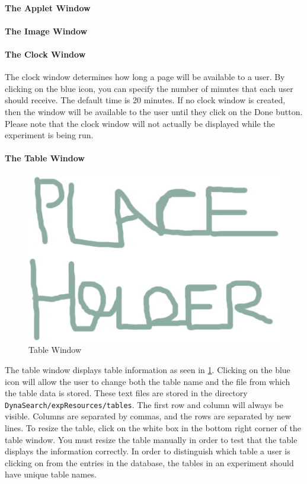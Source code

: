 \documentclass[article]{ij4uq}              %
\begin{document}
\paragraph{The Applet Window}

\paragraph{The Image Window}

\paragraph{The Clock Window}
The clock window determines how long a page will be available to a user. By clicking on the blue icon, you can specify the number of minutes that each user should receive. The default time is 20 minutes. If no clock window is created, then the window will be available to the user until they click on the Done button. Please note that the clock window will not actually be displayed while the experiment is being run. 

\paragraph{The Table Window}

\begin{figure}[h!]
 \centering
 \includegraphics[width=5.0in]{figures/place.eps}
 \caption{Table Window}
 \label{fig:table}
\end{figure}
\FloatBarrier

The table window displays table information as seen in \ref{fig:table}. Clicking on the blue icon will allow the user to change both the table name and the file from which the table data is stored. These text files are stored in the directory \texttt{DynaSearch/expResources/tables}. The first row and column will always be visible. Columns are separated by commas, and the rows are separated by new lines. To resize the table, click on the white box in the bottom right corner of the table window. You must resize the table manually in order to test that the table displays the information correctly. 
In order to distinguish which table a user is clicking on from the entries in the database, the tables in an experiment should have unique table names.
\end{document}
